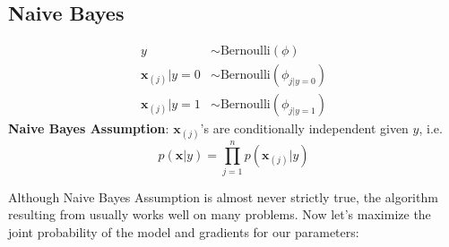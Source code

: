 \documentclass{article}
\renewcommand{\pmb}[1]{\boldsymbol{#1}}
\begin{document}
\subsection{Naive Bayes}
\begin{align*}
	y &\sim \text{Bernoulli}(\phi) \\
	\pmb x_{(j)} | y=0 &\sim \text{Bernoulli}(\phi_{j|y=0}) \\
	\pmb x_{(j)} | y=1 &\sim \text{Bernoulli}(\phi_{j|y=1})
\end{align*}
\textbf{Naive Bayes Assumption}: $\pmb x_{(j)}$'s are conditionally independent given $y$, i.e.
$$p(\pmb x | y) = \prod_{j=1}^n p(\pmb x_{(j)} | y)$$

Although Naive Bayes Assumption is almost never strictly true, the algorithm resulting from usually works well on many problems. Now let's maximize the joint probability of the model and gradients for our parameters:
\end{document}

